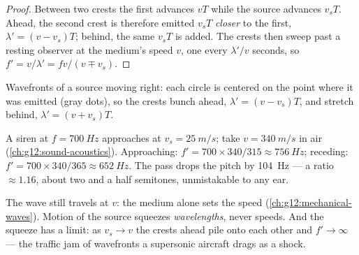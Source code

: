 \begin{proof}
Between two crests the first advances $vT$ while the source advances $v_s T$. Ahead, the
second crest is therefore emitted $v_s T$ \emph{closer} to the first, $\lambda' = (v - v_s)T$;
behind, the same $v_s T$ is added. The crests then sweep past a resting observer at the
medium's speed $v$, one every $\lambda'/v$ seconds, so $f' = v/\lambda' = f v/(v \mp v_s)$.
\end{proof}

\begin{omfigure}

{\small Wavefronts of a source moving right: each circle is centered on the point where
it was emitted (gray dots), so the crests bunch ahead, $\lambda' = (v - v_s)T$, and
stretch behind, $\lambda' = (v + v_s)T$.}
\end{omfigure}

\begin{example}\label{ex:g12:doppler-effect:siren}
A siren at $f = \qty{700}{Hz}$ approaches at $v_s = \qty{25}{m/s}$; take
$v = \qty{340}{m/s}$ in air (\cref{ch:g12:sound-acoustics}). Approaching:
$f' = 700 \times 340/315 \approx \qty{756}{Hz}$; receding:
$f' = 700 \times 340/365 \approx \qty{652}{Hz}$. The pass drops the pitch by \qty{104}{Hz}
--- a ratio $\approx 1.16$, about two and a half semitones, unmistakable to any ear.
\end{example}

\begin{remark}\label{rem:g12:doppler-effect:speed-unchanged}
The wave still travels at $v$: the medium alone sets the speed
(\cref{ch:g12:mechanical-waves}). Motion of the source squeezes \emph{wavelengths}, never
speeds. And the squeeze has a limit: as $v_s \to v$ the crests ahead pile onto each other
and $f' \to \infty$ --- the traffic jam of wavefronts a supersonic aircraft drags as a shock.
\end{remark}

